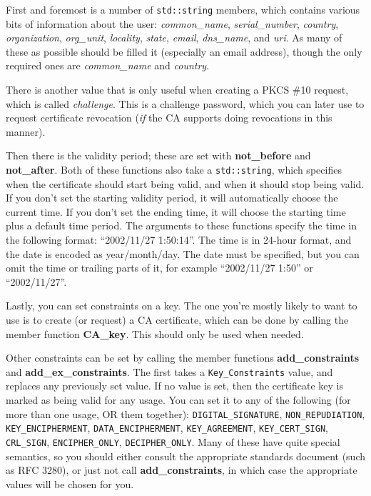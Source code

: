 \documentclass{article}
\newcommand{\function}[1]{\textbf{#1}}
\newcommand{\type}[1]{\texttt{#1}}
\renewcommand{\arg}[1]{\textsl{#1}}
\begin{document}
First and foremost is a number of \type{std::string} members, which contains
various bits of information about the user: \arg{common\_name},
\arg{serial\_number}, \arg{country}, \arg{organization}, \arg{org\_unit},
\arg{locality}, \arg{state}, \arg{email}, \arg{dns\_name}, and \arg{uri}. As
many of these as possible should be filled it (especially an email address),
though the only required ones are \arg{common\_name} and \arg{country}.

There is another value that is only useful when creating a PKCS \#10 request,
which is called \arg{challenge}. This is a challenge password, which you can
later use to request certificate revocation (\emph{if} the CA supports doing
revocations in this manner).

Then there is the validity period; these are set with \function{not\_before}
and \function{not\_after}. Both of these functions also take a
\type{std::string}, which specifies when the certificate should start being
valid, and when it should stop being valid. If you don't set the starting
validity period, it will automatically choose the current time. If you don't
set the ending time, it will choose the starting time plus a default time
period. The arguments to these functions specify the time in the following
format: ``2002/11/27 1:50:14''. The time is in 24-hour format, and the date is
encoded as year/month/day. The date must be specified, but you can omit the
time or trailing parts of it, for example ``2002/11/27 1:50'' or
``2002/11/27''.

Lastly, you can set constraints on a key. The one you're mostly likely to want
to use is to create (or request) a CA certificate, which can be done by calling
the member function \function{CA\_key}. This should only be used when needed.

Other constraints can be set by calling the member functions
\function{add\_constraints} and \function{add\_ex\_constraints}. The
first takes a \type{Key\_Constraints} value, and replaces any
previously set value. If no value is set, then the certificate key is
marked as being valid for any usage.  You can set it to any of the
following (for more than one usage, OR them together):
\type{DIGITAL\_SIGNATURE}, \type{NON\_REPUDIATION},
\type{KEY\_ENCIPHERMENT}, \type{DATA\_ENCIPHERMENT},
\type{KEY\_AGREEMENT}, \type{KEY\_CERT\_SIGN}, \type{CRL\_SIGN},
\type{ENCIPHER\_ONLY}, \type{DECIPHER\_ONLY}. Many of these have quite
special semantics, so you should either consult the appropriate
standards document (such as RFC 3280), or just not call
\function{add\_constraints}, in which case the appropriate values will
be chosen for you.
\end{document}
